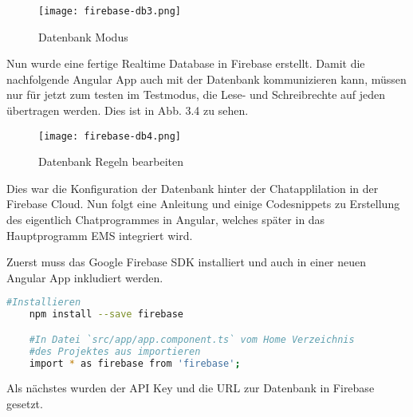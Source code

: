 \begin{center}
    \begin{figure}[h]
        \centering
        \texttt{[image: firebase-db3.png]}
        \caption{Datenbank Modus}
    \end{figure}
\end{center}

Nun wurde eine fertige Realtime Database in Firebase erstellt. Damit die nachfolgende Angular App auch mit der Datenbank kommunizieren kann, müssen nur für jetzt zum testen im Testmodus, die Lese- und Schreibrechte auf
jeden übertragen werden. Dies ist in Abb. 3.4 zu sehen.

\begin{center}
    \begin{figure}[h]
        \centering
        \texttt{[image: firebase-db4.png]}
        \caption{Datenbank Regeln bearbeiten}
    \end{figure}
\end{center}

Dies war die Konfiguration der Datenbank hinter der Chatapplilation in der Firebase Cloud. Nun folgt eine Anleitung und einige Codesnippets zu Erstellung des eigentlich Chatprogrammes in Angular, welches später in das Hauptprogramm
EMS integriert wird.

Zuerst muss das Google Firebase SDK installiert und auch in einer neuen Angular App inkludiert werden.

\begin{lstlisting}[language=bash]
    #Installieren
    npm install --save firebase

    #In Datei `src/app/app.component.ts` vom Home Verzeichnis 
    #des Projektes aus importieren
    import * as firebase from 'firebase';
\end{lstlisting}

Als nächstes wurden der API Key und die URL zur Datenbank in Firebase gesetzt.





\newpage